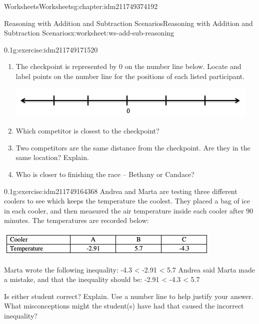 \documentclass[twoside,11pt,]{book}
\begin{document}
\begin{chapterptx}{Worksheets}{}{Worksheets}{}{}{g:chapter:idm211749374192}
\begin{worksheet-section-numberless}{Reasoning with Addition and Subtraction Scenarios}{}{Reasoning with Addition and Subtraction Scenarios}{}{}{x:worksheet:ws-add-sub-reasoning}
\begin{divisionexercise}{5}{}{0.1}{g:exercise:idm211749171520}
\begin{sidebyside}{1}{0.05}{0.05}{0}
\begin{sbspanel}{0.9}
\end{sbspanel}%
\end{sidebyside}%
%
\begin{enumerate}[label=(\alph*)]
\item{}The checkpoint is represented by 0 on the number line below.  Locate and label points on the number line for the positions of each listed participant. \begin{sidebyside}{1}{0.05}{0.05}{0}%
\begin{sbspanel}{0.9}%
\includegraphics[width=1\linewidth]{images/blank-number-line.png}
\end{sbspanel}%
\end{sidebyside}%
%
\item{}Which competitor is closest to the checkpoint?%
\item{}Two competitors are the same distance from the checkpoint.  Are they in the same location?  Explain.%
\item{}Who is closer to finishing the race – Bethany or Candace?%
\end{enumerate}
\end{divisionexercise}%
\clearpage
\begin{divisionexercise}{6}{}{0.1}{g:exercise:idm211749164368}%
Andrea and Marta are testing three different coolers to see which keeps the temperature the coolest.  They placed a bag of ice in each cooler, and then measured the air temperature inside each cooler after 90 minutes.  The temperatures are recorded below:%
\begin{image}{0}{1}{0}%
\includegraphics[width=1\linewidth]{images/reasoning-table-cooler.png}
\end{image}%
Marta wrote the following inequality: -4.3 \textless{}  -2.91 \textless{} 5.7 Andrea said Marta made a mistake, and that the inequality should be: -2.91 \textless{} -4.3 \textless{} 5.7%
\par
Is either student correct?  Explain.  Use a number line to help justify your answer.  What misconceptions might the student(s) have had that caused the incorrect inequality?%
\end{divisionexercise}%

\end{worksheet-section-numberless}
\end{chapterptx}
\end{document}
